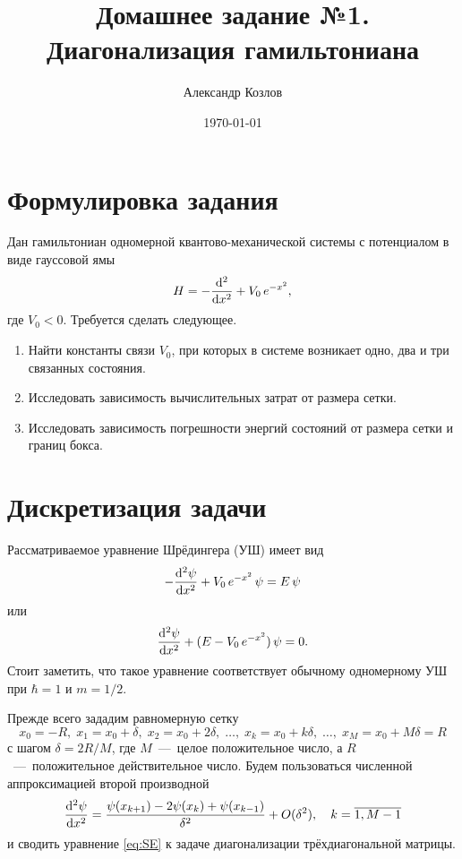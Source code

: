 \documentclass[10pt]{article}
\title{Домашнее задание №1. Диагонализация гамильтониана}
\author{Александр Козлов}
\date{\today}
\begin{document}
\maketitle

\section*{Формулировка задания}

Дан гамильтониан одномерной квантово-механической системы с потенциалом в виде гауссовой ямы
\begin{equation}
    H = - \dv[2]{}{x} + V_0\, e^{-x^2},
\end{equation}
где $V_0 < 0$. Требуется сделать следующее.

\begin{enumerate}
    \item Найти константы связи $V_0$, при которых в системе возникает одно, два и три связанных состояния.

    \item Исследовать зависимость вычислительных затрат от размера сетки.

    \item Исследовать зависимость погрешности энергий состояний от размера сетки и границ бокса.
\end{enumerate}

\section{Дискретизация задачи}

Рассматриваемое уравнение Шрёдингера (УШ) имеет вид
\begin{equation}
    -\dv[2]{\psi}{x} + V_0\, e^{-x^2}\, \psi  = E\, \psi
    \label{eq:SE}
\end{equation}
или
\begin{equation}
    \dv[2]{\psi}{x}  + (E - V_0\, e^{-x^2})\, \psi  = 0.
\end{equation}
Стоит заметить, что такое уравнение соответствует обычному одномерному УШ при $\hbar=1$ и $m=1/2$. 

Прежде всего зададим равномерную сетку
\begin{equation}
    x_0 = -R,\; x_1 = x_0 + \delta,\; x_2 = x_0 + 2\delta,\; \ldots,\; x_k = x_0 + k\delta,\; \ldots,\; x_M = x_0 + M \delta = R
\end{equation}
с шагом $\delta = 2R/M$, где $M$~---~целое положительное число, а $R$~---~положительное действительное число. Будем пользоваться численной аппроксимацией второй производной
\begin{equation}
    \dv[2]{\psi}{x}(x_k) = \dfrac{\psi(x_{k+1}) - 2\psi(x_{k}) + \psi(x_{k-1})}{\delta^2} + O(\delta^2),\quad k = \overline{1,M-1}
\end{equation}
и сводить уравнение \eqref{eq:SE} к задаче диагонализации трёхдиагональной матрицы. 
\end{document}
